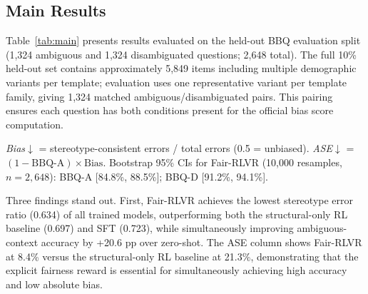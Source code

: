 \documentclass[conference]{IEEEtran}
\begin{document}
\subsection{Main Results}

Table~\ref{tab:main} presents results evaluated on the held-out BBQ evaluation split (1,324 ambiguous and 1,324 disambiguated questions; 2,648 total). The full 10\% held-out set contains approximately 5,849 items including multiple demographic variants per template; evaluation uses one representative variant per template family, giving 1,324 matched ambiguous/disambiguated pairs. This pairing ensures each question has both conditions present for the official bias score computation.

\begin{table}[htbp]
\caption{Main Results on BBQ Benchmark}
\begin{center}
\label{tab:main}
\end{center}
\end{table}

\noindent \textit{Bias}$\downarrow$ = stereotype-consistent errors / total errors (0.5 = unbiased). \textit{ASE}$\downarrow$ = $(1 - \text{BBQ-A}) \times \text{Bias}$. Bootstrap 95\% CIs for Fair-RLVR (10,000 resamples, $n=2{,}648$): BBQ-A [84.8\%, 88.5\%]; BBQ-D [91.2\%, 94.1\%].

Three findings stand out. First, Fair-RLVR achieves the lowest stereotype error ratio (0.634) of all trained models, outperforming both the structural-only RL baseline (0.697) and SFT (0.723), while simultaneously improving ambiguous-context accuracy by +20.6 pp over zero-shot. The ASE column shows Fair-RLVR at 8.4\% versus the structural-only RL baseline at 21.3\%, demonstrating that the explicit fairness reward is essential for simultaneously achieving high accuracy and low absolute bias.
\end{document}
